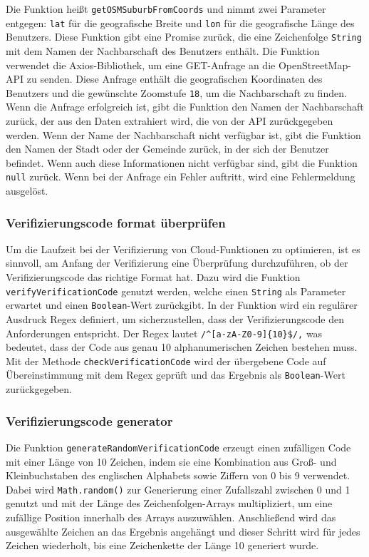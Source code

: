 Die Funktion heißt \texttt{getOSMSuburbFromCoords} und nimmt zwei Parameter entgegen: \texttt{lat} für die geografische Breite und \texttt{lon} für die geografische Länge des Benutzers. Diese Funktion gibt eine Promise zurück, die eine Zeichenfolge \texttt{String} mit dem Namen der Nachbarschaft des Benutzers enthält. Die Funktion verwendet die Axios-Bibliothek, um eine GET-Anfrage an die OpenStreetMap-API zu senden. Diese Anfrage enthält die geografischen Koordinaten des Benutzers und die gewünschte Zoomstufe \texttt{18}, um die Nachbarschaft zu finden. Wenn die Anfrage erfolgreich ist, gibt die Funktion den Namen der Nachbarschaft zurück, der aus den Daten extrahiert wird, die von der API zurückgegeben werden. Wenn der Name der Nachbarschaft nicht verfügbar ist, gibt die Funktion den Namen der Stadt oder der Gemeinde zurück, in der sich der Benutzer befindet. Wenn auch diese Informationen nicht verfügbar sind, gibt die Funktion \texttt{null} zurück. Wenn bei der Anfrage ein Fehler auftritt, wird eine Fehlermeldung ausgelöst.


\subsubsection{Verifizierungscode format überprüfen}
Um die Laufzeit bei der Verifizierung von Cloud-Funktionen zu optimieren, ist es sinnvoll, am Anfang der Verifizierung eine Überprüfung durchzuführen, ob der Verifizierungscode das richtige Format hat. Dazu wird die Funktion \texttt{verifyVerificationCode} genutzt werden, welche einen \texttt{String} als Parameter erwartet und einen \texttt{Boolean}-Wert zurückgibt. In der Funktion wird ein regulärer Ausdruck Regex definiert, um sicherzustellen, dass der Verifizierungscode den Anforderungen entspricht. Der Regex lautet \texttt{/}\verb|^[a-zA-Z0-9]{10}$/|\texttt{,} was bedeutet, dass der Code aus genau 10 alphanumerischen Zeichen bestehen muss. Mit der Methode \texttt{checkVerificationCode} wird der übergebene Code auf Übereinstimmung mit dem Regex geprüft und das Ergebnis als \texttt{Boolean}-Wert zurückgegeben.

\subsubsection{Verifizierungscode generator}

Die Funktion \texttt{generateRandomVerificationCode} erzeugt einen zufälligen Code mit einer Länge von 10 Zeichen, indem sie eine Kombination aus Groß- und Kleinbuchstaben des englischen Alphabets sowie Ziffern von 0 bis 9 verwendet. Dabei wird \texttt{Math.random()} zur Generierung einer Zufallszahl zwischen 0 und 1 genutzt und mit der Länge des Zeichenfolgen-Arrays multipliziert, um eine zufällige Position innerhalb des Arrays auszuwählen. Anschließend wird das ausgewählte Zeichen an das Ergebnis angehängt und dieser Schritt wird für jedes Zeichen wiederholt, bis eine Zeichenkette der Länge 10 generiert wurde.

